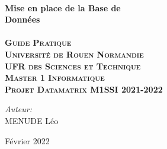 \begin{titlepage}

\center %



\HRule \\[0.4cm]
{ \huge \bfseries Mise en place de la Base de\\ Données}\\[0.4cm] %
\HRule \\[1.5cm]

\textsc{\huge \textbf{Guide Pratique}}\\[1.5cm]

\textsc{\Large \textbf{Université de Rouen Normandie \\[0.07cm] UFR des Sciences et Technique \\[1,5cm] Master 1 Informatique\\[0.5cm] Projet Datamatrix M1SSI 2021-2022}}


\vspace{3cm}

\begin{center} \large
\Large \emph{Auteur:}\\[0.1cm]
\Large MENUDE Léo
\end{center}



{\large Février 2022}\\[2cm] %


\end{titlepage}
